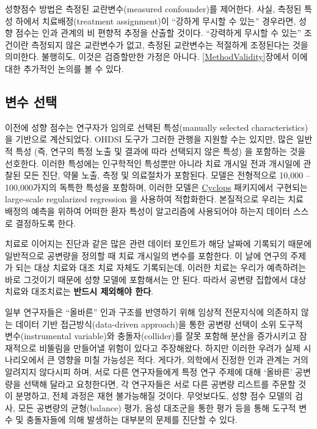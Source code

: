 \documentclass[11pt]{book}
\theoremstyle{definition}
\theoremstyle{definition}
\theoremstyle{definition}
\theoremstyle{remark}
\let\BeginKnitrBlock\begin \let\EndKnitrBlock\end
\begin{document}
성향점수 방법은 측정된 교란변수(measured confounder)를 제어한다. 사실,
측정된 특성 하에서 치료배정(treatment assignment)이 ``강하게 무시할 수
있는'' 경우라면, 성향 점수는 인과 관계의 비 편향적 추정을 산출할 것이다.
``강력하게 무시할 수 있는'' 조건이란 측정되지 않은 교란변수가 없고,
측정된 교란변수는 적절하게 조정된다는 것을 의미한다. 불행히도, 이것은
검증할만한 가정은 아니다. \ref{MethodValidity}장에서 이에 대한 추가적인
논의를 볼 수 있다. 

\subsection{변수 선택}\label{VariableSelection}

이전에 성향 점수는 연구자가 임의로 선택된 특성(manually selected
characteristics)을 기반으로 계산되었다. OHDSI 도구가 그러한 관행을
지원할 수는 있지만, 많은 일반적 특성 (즉, 연구의 특정 노출 및 결과에
따라 선택되지 않은 특성) 을 포함하는 것을 선호한다. \citep{tian_2018}
이러한 특성에는 인구학적인 특성뿐만 아니라 치료 개시일 전과 개시일에
관찰된 모든 진단, 약물 노출, 측정 및 의료절차가 포함된다. 모델은
전형적으로 10,000 -- 100,000가지의 독특한 특성을 포함하며, 이러한 모델은
\href{https://ohdsi.github.io/Cyclops/}{Cyclops} 패키지에서 구현되는
large-scale regularized regression \citep{suchard_2013} 을 사용하여
적합화한다. 본질적으로 우리는 치료 배정의 예측을 위하여 어떠한 환자
특성이 알고리즘에 사용되어야 하는지 데이터 스스로 결정하도록 한다.

\BeginKnitrBlock{rmdimportant}
치료로 이어지는 진단과 같은 많은 관련 데이터 포인트가 해당 날짜에
기록되기 때문에 일반적으로 공변량을 정의할 때 치료 개시일의 변수를
포함한다. 이 날에 연구의 주제가 되는 대상 치료와 대조 치료 자체도
기록되는데, 이러한 치료는 우리가 예측하려는 바로 그것이기 때문에 성향
모델에 포함해서는 안 된다. 따라서 공변량 집합에서 대상 치료와 대조치료는
\textbf{반드시 제외해야 한다}.
\EndKnitrBlock{rmdimportant}

일부 연구자들은 ``올바른'' 인과 구조를 반영하기 위해 임상적 전문지식에
의존하지 않는 데이터 기반 접근방식(data-driven approach)을 통한 공변량
선택이 소위 도구적 변수(instrumental variable)와 충돌자(collider)를 잘못
포함해 분산을 증가시키고 잠재적으로 비뚤림을 만들어낼 위험이 있다고
주장해왔다. \citep{hernan_2002} 하지만 이러한 우려가 실제 시나리오에서
큰 영향을 미칠 가능성은 적다. \citep{schneeweiss_2018} 게다가, 의학에서
진정한 인과 관계는 거의 알려지지 않다시피 하며, 서로 다른 연구자들에게
특정 연구 주제에 대해 `올바른' 공변량을 선택해 달라고 요청한다면, 각
연구자들은 서로 다른 공변량 리스트를 주문할 것이 분명하고, 전체 과정은
재현 불가능해질 것이다. 무엇보다도, 성향 점수 모델의 검사, 모든 공변량의
균형(balance) 평가, 음성 대조군을 통한 평가 등을 통해 도구적 변수 및
충돌자들에 의해 발생하는 대부분의 문제를 진단할 수 있다.
 
\end{document}
